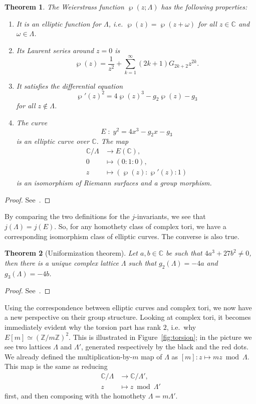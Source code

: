 \documentclass[10pt]{article}
\theoremstyle{plain}
\newtheorem{theorem}{Theorem}
\theoremstyle{definition}
\begin{document}
\begin{theorem}
  \label{th:weierstrass-p}
  The Weierstrass function $℘(z;Λ)$ has the following properties:
  \begin{enumerate}
  \item It is an \emph{elliptic function} for $Λ$, i.e.
    $℘(z) = ℘(z+ω)$ for all $z∈ℂ$ and $ω∈Λ$.
  \item Its Laurent series around $z=0$ is
    \[℘(z) = \frac{1}{z^2} + \sum_{k=1}^∞(2k+1)G_{2k+2}z^{2k}.\]
  \item It satisfies the differential equation
    \[℘'(z)^2 = 4℘(z)^3 - g_2℘(z) - g_3\]
    for all $z∉Λ$.
  \item The curve
    \[E\;:\;y^2=4x^3 - g_2x - g_3\]
    is an elliptic curve over $ℂ$. The map
    \begin{align*}
      ℂ/Λ &\to E(ℂ),\\
      0 &\mapsto (0:1:0),\\
      z &\mapsto (℘(z):℘'(z):1)
    \end{align*}
    is an isomorphism of Riemann surfaces and a group morphism.
  \end{enumerate}
\end{theorem}
\begin{proof}
  See~\cite[VI, Th.~3.1, Th.~3.5, Prop.~3.6]{silverman:elliptic}.
\end{proof}

By comparing the two definitions for the $j$-invariants, we see that
$j(Λ)=j(E)$. %
So, for any homothety class of complex tori, we have a corresponding
isomorphism class of elliptic curves. %
The converse is also true.

\begin{theorem}[Uniformization theorem]
  Let $a,b∈ℂ$ be such that $4a^3+27b^2≠0$, then there is a unique
  complex lattice $Λ$ such that $g_2(Λ) = -4a$ and $g_3(Λ) = -4b$.
\end{theorem}
\begin{proof}
  See~\cite[I, Coro.~4.3]{silverman:advanced}.
\end{proof}

Using the correspondence between elliptic curves and complex tori, we
now have a new perspective on their group structure. %
Looking at complex tori, it becomes immediately evident why the
torsion part has rank $2$, i.e.\ why $E[m]≃(ℤ/mℤ)^2$. %
This is illustrated in Figure~\ref{fig:torsion}; in the picture we see
two lattices $Λ$ and $Λ'$, generated respectively by the black and the
red dots. %
We already defined the multiplication-by-$m$ map of $Λ$ as
$[m]:z \mapsto mz \bmod Λ$. %
This map is the same as reducing
\begin{align*}
  ℂ/Λ &\to ℂ/Λ',\\
  z &\mapsto z \bmod Λ'
\end{align*}
first, and then composing with the homothety $Λ = mΛ'$.
\end{document}
